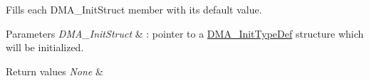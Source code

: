 Fills each D\+M\+A\+\_\+\+Init\+Struct member with its default value. 


\begin{DoxyParams}{Parameters}
{\em D\+M\+A\+\_\+\+Init\+Struct} & \+: pointer to a \mbox{\hyperlink{struct_d_m_a___init_type_def}{D\+M\+A\+\_\+\+Init\+Type\+Def}} structure which will be initialized. \\
\hline
\end{DoxyParams}

\begin{DoxyRetVals}{Return values}
{\em None} & \\
\hline
\end{DoxyRetVals}
